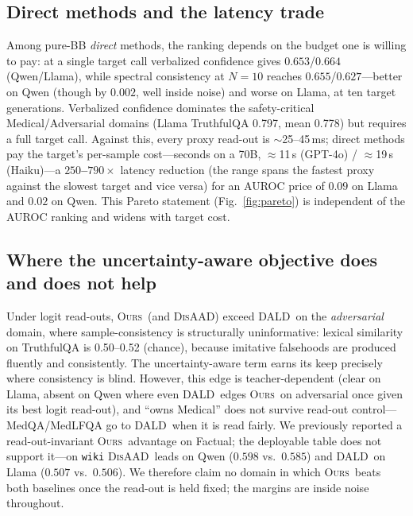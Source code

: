\documentclass[11pt]{article}
\newcommand{\ours}{\textsc{Ours}}
\newcommand{\dald}{\textsc{DALD}}
\newcommand{\disaad}{\textsc{DisAAD}}
\begin{document}
\subsection{Direct methods and the latency trade}

Among pure-BB \emph{direct} methods, the ranking depends on the budget one is willing to pay:
at a single target call verbalized confidence gives $0.653$/$0.664$ (Qwen/Llama), while
spectral consistency at $N{=}10$ reaches $0.655$/$0.627$---better on Qwen (though by $0.002$,
well inside noise) and worse on Llama, at ten target generations. Verbalized confidence dominates the safety-critical Medical/Adversarial
domains (Llama TruthfulQA 0.797, mean 0.778) but requires a full target call. Against
this, every proxy read-out is $\sim$25--45\,ms; direct methods pay the target's
per-sample cost---seconds on a 70B, $\approx$11\,s (GPT-4o) / $\approx$19\,s
(Haiku)---a \textbf{$250$--$790\times$} latency reduction (the range spans the fastest proxy
against the slowest target and vice versa) for an AUROC price of $0.09$ on Llama and $0.02$ on
Qwen. This
Pareto statement (Fig.~\ref{fig:pareto}) is independent of the AUROC ranking and widens with target cost.

\subsection{Where the uncertainty-aware objective does and does not help}

Under logit read-outs, \ours\ (and \disaad) exceed \dald\ on the \emph{adversarial}
domain, where sample-consistency is structurally uninformative: lexical similarity on
TruthfulQA is 0.50--0.52 (chance), because imitative falsehoods are produced fluently
and consistently. The uncertainty-aware term earns its keep precisely where consistency
is blind. However, this edge is teacher-dependent (clear on Llama, absent on Qwen where
even \dald\ edges \ours\ on adversarial once given its best logit read-out), and
``owns Medical'' does not survive read-out control---MedQA/MedLFQA go to \dald\ when it
is read fairly. We previously reported a read-out-invariant \ours\ advantage on Factual; the
deployable table does not support it---on \texttt{wiki} \disaad\ leads on Qwen ($0.598$ vs.\
$0.585$) and \dald\ on Llama ($0.507$ vs.\ $0.506$). We therefore claim no domain in which
\ours\ beats both baselines once the read-out is held fixed; the margins are inside noise
throughout.
\end{document}
